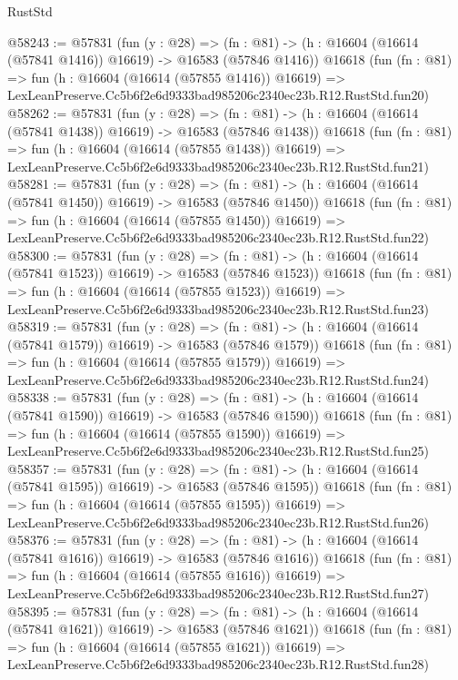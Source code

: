 \begin{lexlean}{RustStd}
\begin{coremodule}
@58243 := @57831
    (fun (y : @28) =>
    (fn : @81) -> (h : @16604 (@16614 (@57841 @1416)) @16619) -> @16583 (@57846 @1416))
    @16618
    (fun (fn : @81) =>
    fun (h : @16604 (@16614 (@57855 @1416)) @16619) =>
    LexLeanPreserve.Cc5b6f2e6d9333bad985206c2340ec23b.R12.RustStd.fun20)
@58262 := @57831
    (fun (y : @28) =>
    (fn : @81) -> (h : @16604 (@16614 (@57841 @1438)) @16619) -> @16583 (@57846 @1438))
    @16618
    (fun (fn : @81) =>
    fun (h : @16604 (@16614 (@57855 @1438)) @16619) =>
    LexLeanPreserve.Cc5b6f2e6d9333bad985206c2340ec23b.R12.RustStd.fun21)
@58281 := @57831
    (fun (y : @28) =>
    (fn : @81) -> (h : @16604 (@16614 (@57841 @1450)) @16619) -> @16583 (@57846 @1450))
    @16618
    (fun (fn : @81) =>
    fun (h : @16604 (@16614 (@57855 @1450)) @16619) =>
    LexLeanPreserve.Cc5b6f2e6d9333bad985206c2340ec23b.R12.RustStd.fun22)
@58300 := @57831
    (fun (y : @28) =>
    (fn : @81) -> (h : @16604 (@16614 (@57841 @1523)) @16619) -> @16583 (@57846 @1523))
    @16618
    (fun (fn : @81) =>
    fun (h : @16604 (@16614 (@57855 @1523)) @16619) =>
    LexLeanPreserve.Cc5b6f2e6d9333bad985206c2340ec23b.R12.RustStd.fun23)
@58319 := @57831
    (fun (y : @28) =>
    (fn : @81) -> (h : @16604 (@16614 (@57841 @1579)) @16619) -> @16583 (@57846 @1579))
    @16618
    (fun (fn : @81) =>
    fun (h : @16604 (@16614 (@57855 @1579)) @16619) =>
    LexLeanPreserve.Cc5b6f2e6d9333bad985206c2340ec23b.R12.RustStd.fun24)
@58338 := @57831
    (fun (y : @28) =>
    (fn : @81) -> (h : @16604 (@16614 (@57841 @1590)) @16619) -> @16583 (@57846 @1590))
    @16618
    (fun (fn : @81) =>
    fun (h : @16604 (@16614 (@57855 @1590)) @16619) =>
    LexLeanPreserve.Cc5b6f2e6d9333bad985206c2340ec23b.R12.RustStd.fun25)
@58357 := @57831
    (fun (y : @28) =>
    (fn : @81) -> (h : @16604 (@16614 (@57841 @1595)) @16619) -> @16583 (@57846 @1595))
    @16618
    (fun (fn : @81) =>
    fun (h : @16604 (@16614 (@57855 @1595)) @16619) =>
    LexLeanPreserve.Cc5b6f2e6d9333bad985206c2340ec23b.R12.RustStd.fun26)
@58376 := @57831
    (fun (y : @28) =>
    (fn : @81) -> (h : @16604 (@16614 (@57841 @1616)) @16619) -> @16583 (@57846 @1616))
    @16618
    (fun (fn : @81) =>
    fun (h : @16604 (@16614 (@57855 @1616)) @16619) =>
    LexLeanPreserve.Cc5b6f2e6d9333bad985206c2340ec23b.R12.RustStd.fun27)
@58395 := @57831
    (fun (y : @28) =>
    (fn : @81) -> (h : @16604 (@16614 (@57841 @1621)) @16619) -> @16583 (@57846 @1621))
    @16618
    (fun (fn : @81) =>
    fun (h : @16604 (@16614 (@57855 @1621)) @16619) =>
    LexLeanPreserve.Cc5b6f2e6d9333bad985206c2340ec23b.R12.RustStd.fun28)

\end{coremodule}
\end{lexlean}
